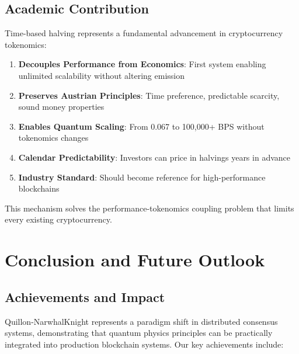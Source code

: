 \documentclass[11pt,a4paper]{article}
\begin{document}
\subsection{Academic Contribution}

Time-based halving represents a fundamental advancement in cryptocurrency tokenomics:

\begin{enumerate}
    \item \textbf{Decouples Performance from Economics}: First system enabling unlimited scalability without altering emission
    \item \textbf{Preserves Austrian Principles}: Time preference, predictable scarcity, sound money properties
    \item \textbf{Enables Quantum Scaling}: From 0.067 to 100,000+ BPS without tokenomics changes
    \item \textbf{Calendar Predictability}: Investors can price in halvings years in advance
    \item \textbf{Industry Standard}: Should become reference for high-performance blockchains
\end{enumerate}

This mechanism solves the performance-tokenomics coupling problem that limits every existing cryptocurrency.

\section{Conclusion and Future Outlook}

\subsection{Achievements and Impact}

Quillon-NarwhalKnight represents a paradigm shift in distributed consensus systems, demonstrating that quantum physics principles can be practically integrated into production blockchain systems. Our key achievements include:
\end{document}
